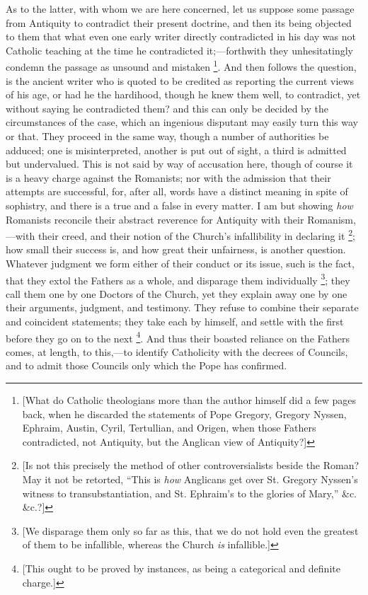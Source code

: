 As to the latter, with whom we are here concerned, let us suppose
some passage from Antiquity to contradict their present doctrine, and
then its being objected to them that what even one early writer
directly contradicted in his day was not Catholic teaching at the time
he contradicted it;—forthwith they unhesitatingly condemn the
passage as unsound and mistaken \footnote{[What do Catholic theologians more than the
author himself did a few pages back, when he discarded the statements
of Pope Gregory, Gregory Nyssen, Ephraim, Austin, Cyril, Tertullian,
and Origen, when those Fathers contradicted, not Antiquity, but the
Anglican view of Antiquity?]}. And then follows the question, is the ancient writer who is
quoted to be credited as reporting the current views of his age,
or had he the hardihood, though he knew them well, to contradict, yet
without saying he contradicted them? and this can only be decided by
the circumstances of the case, which an ingenious disputant may easily
turn this way or that. They proceed in the same way, though a number
of authorities be adduced; one is misinterpreted, another is put out
of sight, a third is admitted but undervalued. This is not said by way
of accusation here, though of course it is a heavy charge against the
Romanists; nor with the admission that their attempts are successful,
for, after all, words have a distinct meaning in spite of sophistry,
and there is a true and a false in every matter. I am but showing \emph{how}
Romanists reconcile their abstract reverence for Antiquity with their
Romanism,—with their creed, and their notion of the Church's
infallibility in declaring it \footnote{[Is not this precisely the method of other
controversialists beside the Roman? May it not be retorted, ``This
is \emph{how} Anglicans get over St. Gregory Nyssen's witness to
transubstantiation, and St. Ephraim's to the glories of Mary,''
\&c. \&c.?]};
how small their success is, and how great their unfairness, is another
question. Whatever judgment we form either of their conduct or its
issue, such is the fact, that they extol the Fathers as a whole, and
disparage them individually \footnote{[We disparage them only so far as this,
that we do not hold even the greatest of them to be infallible,
whereas the Church \emph{is} infallible.]};
they call them one by one Doctors of the Church, yet they explain away
one by one their arguments, judgment, and testimony. They refuse to
combine their separate and coincident statements; they take each by
himself, and settle with the first before they go on to the next \footnote{[This ought to be proved by instances, as
being a categorical and definite charge.]}. And thus their boasted reliance on the Fathers comes, at
length, to this,—to identify Catholicity with the decrees of
Councils, and to admit those Councils only which the Pope has
confirmed.

